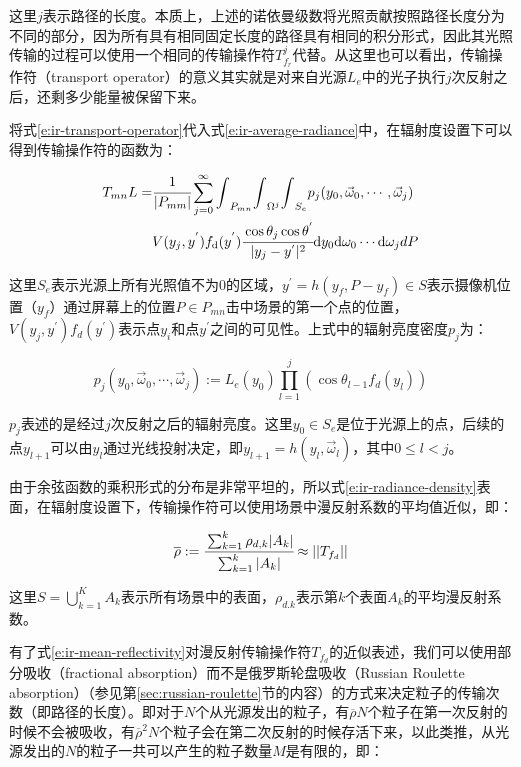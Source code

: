 \noindent 这里$j$表示路径的长度。本质上，上述的诺依曼级数将光照贡献按照路径长度分为不同的部分，因为所有具有相同固定长度的路径具有相同的积分形式，因此其光照传输的过程可以使用一个相同的传输操作符$T^{j}_{f_r}$代替。从这里也可以看出，传输操作符（transport operator）的意义其实就是对来自光源$L_e$中的光子执行$j$次反射之后，还剩多少能量被保留下来。

将式\ref{e:ir-transport-operator}代入式\ref{e:ir-average-radiance}中，在辐射度设置下可以得到传输操作符的函数为：

\begin{equation}
\begin{aligned}
	T_{mn}L=& \cfrac{1}{|P_{mm}|}\sum^{\infty}_{j=0}{\rm \int}_{P_{mn}}{\rm \int}_{\Omega^{j}}{\rm \int}_{S_e}p_j(y_0,\vec{\omega}_0,\cdots,\vec{\omega}_j)\\
	&V(y_j,y^{'})f_{\rm d}(y^{'}) \cfrac{\cos\theta_j\cos\theta^{'}}{|y_j-y^{'}|^{2}}{\rm d}y_0{\rm d}\omega_0\cdots {\rm d}\omega_jdP
\end{aligned}
\end{equation}

\noindent 这里$S_e$表示光源上所有光照值不为0的区域，$y^{'}=h(y_f,P-y_f)\in S$表示摄像机位置（$y_f$）通过屏幕上的位置$P\in P_{mn}$击中场景的第一个点的位置，$V(y_j,y^{'})f_d(y^{'})$表示点$y_i$和点$y^{'}$之间的可见性。上式中的辐射亮度密度$p_j$为：

\begin{equation}\label{e:ir-radiance-density}
	p_j(y_0,\vec{\omega}_0,\cdots,\vec{\omega}_j):=L_e(y_0)\prod^{j}_{l=1}(\cos\theta_{l-1}f_d(y_l))
\end{equation}

\noindent $p_j$表述的是经过$j$次反射之后的辐射亮度。这里$y_0\in S_e$是位于光源上的点，后续的点$y_{l+1}$可以由$y_l$通过光线投射决定，即$y_{l+1}=h(y_l,\vec{\omega}_l)$，其中$0\leq l<j$。

由于余弦函数的乘积形式的分布是非常平坦的，所以式\ref{e:ir-radiance-density}表面，在辐射度设置下，传输操作符可以使用场景中漫反射系数的平均值近似，即：

\begin{equation}\label{e:ir-mean-reflectivity}
	\overline{\rho}:= \cfrac{\sum^{k}_{k=1}\rho_{d,k}|A_k|}{\sum^{k}_{k=1}|A_k|}\approx ||T_{f_d}||
\end{equation}

\noindent 这里$S=\bigcup^{K}_{k=1}A_k$表示所有场景中的表面，$\rho_{d.k}$表示第$k$个表面$A_k$的平均漫反射系数。

有了式\ref{e:ir-mean-reflectivity}对漫反射传输操作符$T_{f_d}$的近似表述，我们可以使用部分吸收（fractional absorption）而不是俄罗斯轮盘吸收（Russian Roulette absorption）（参见第\ref{sec:russian-roulette}节的内容）的方式来决定粒子的传输次数（即路径的长度）。即对于$N$个从光源发出的粒子，有$\overline{\rho}N$个粒子在第一次反射的时候不会被吸收，有$\overline{\rho}^{2}N$个粒子会在第二次反射的时候存活下来，以此类推，从光源发出的$N$的粒子一共可以产生的粒子数量$M$是有限的，即：

